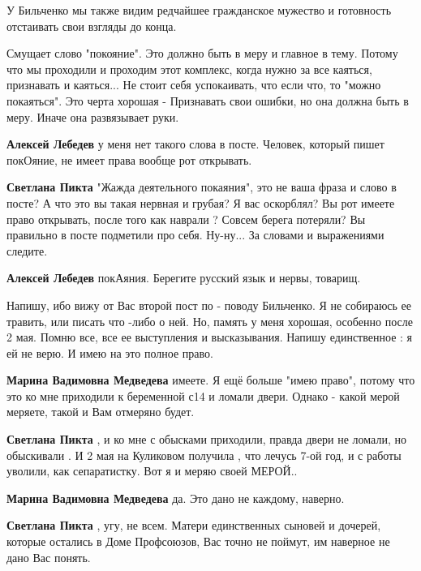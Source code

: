 \begin{itemize}
У Бильченко мы также видим редчайшее гражданское мужество и готовность
отстаивать свои взгляды до конца.


Смущает слово "покояние". Это должно быть в меру и главное в тему. Потому что
мы проходили и проходим этот комплекс, когда нужно за все каяться, признавать и
каяться... Не стоит себя успокаивать, что если что, то "можно покаяться". Это
черта хорошая - Признавать свои ошибки, но она должна быть в меру. Иначе она
развязывает руки.

\begin{itemize} %
\textbf{Алексей Лебедев} у меня нет такого слова в посте. Человек, который пишет покОяние, не имеет права вообще рот открывать.

\textbf{Светлана Пикта} "Жажда деятельного покаяния", это не ваша фраза и слово в посте?
А что это вы такая нервная и грубая? Я вас оскорблял? Вы рот имеете право открывать, после того как наврали ? Совсем берега потеряли? Вы правильно в посте подметили про себя. Ну-ну... За словами и выражениями следите.

\textbf{Алексей Лебедев} покАяния. Берегите русский язык и нервы, товарищ.
\end{itemize} %


Напишу, ибо вижу от Вас второй пост по - поводу Бильченко. Я не собираюсь ее
травить, или писать что -либо о ней. Но, память у меня хорошая, особенно после
2 мая. Помню все, все ее выступления и высказывания. Напишу единственное : я ей
не верю. И имею на это полное право.

\begin{itemize} %
\textbf{Марина Вадимовна Медведева} имеете. Я ещё больше "имею право", потому что это ко мне приходили к беременной с14 и ломали двери. Однако - какой мерой меряете, такой и Вам отмеряно будет.

\textbf{Светлана Пикта} , и ко мне с обысками приходили, правда двери не ломали, но обыскивали . И 2 мая на Куликовом получила , что лечусь 7-ой год, и с работы уволили, как сепаратистку. Вот я и меряю своей МЕРОЙ..

\textbf{Марина Вадимовна Медведева} да. Это дано не каждому, наверно.

\textbf{Светлана Пикта} , угу, не всем. Матери единственных сыновей и дочерей, которые остались в Доме Профсоюзов, Вас точно не поймут, им наверное не дано Вас понять.


\end{itemize}
\end{itemize}
